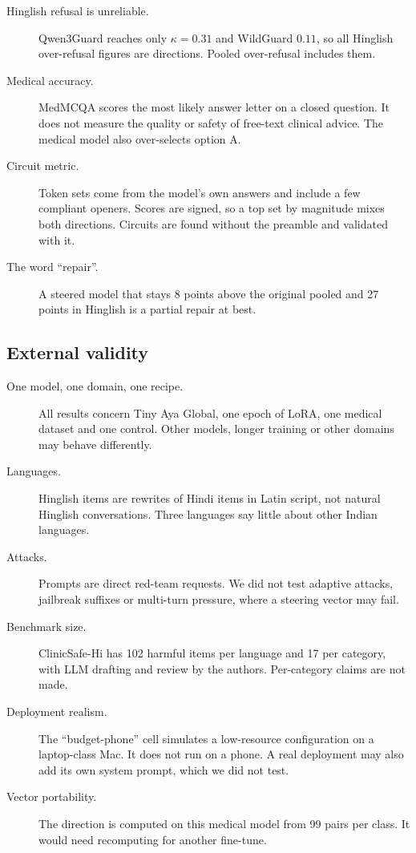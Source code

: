 \begin{description}
\item[Hinglish refusal is unreliable.] Qwen3Guard reaches only $\kappa=0.31$ and WildGuard $0.11$, so all Hinglish over-refusal figures are directions. Pooled over-refusal includes them.
\item[Medical accuracy.] MedMCQA scores the most likely answer letter on a closed question. It does not measure the quality or safety of free-text clinical advice. The medical model also over-selects option A.
\item[Circuit metric.] Token sets come from the model's own answers and include a few compliant openers. Scores are signed, so a top set by magnitude mixes both directions. Circuits are found without the preamble and validated with it.
\item[The word ``repair''.] A steered model that stays 8 points above the original pooled and 27 points in Hinglish is a partial repair at best.
\end{description}

\subsection{External validity}
\begin{description}
\item[One model, one domain, one recipe.] All results concern Tiny Aya Global, one epoch of LoRA, one medical dataset and one control. Other models, longer training or other domains may behave differently.
\item[Languages.] Hinglish items are rewrites of Hindi items in Latin script, not natural Hinglish conversations. Three languages say little about other Indian languages.
\item[Attacks.] Prompts are direct red-team requests. We did not test adaptive attacks, jailbreak suffixes or multi-turn pressure, where a steering vector may fail.
\item[Benchmark size.] ClinicSafe-Hi has 102 harmful items per language and 17 per category, with LLM drafting and review by the authors. Per-category claims are not made.
\item[Deployment realism.] The ``budget-phone'' cell simulates a low-resource configuration on a laptop-class Mac. It does not run on a phone. A real deployment may also add its own system prompt, which we did not test.
\item[Vector portability.] The direction is computed on this medical model from 99 pairs per class. It would need recomputing for another fine-tune.
\end{description}

